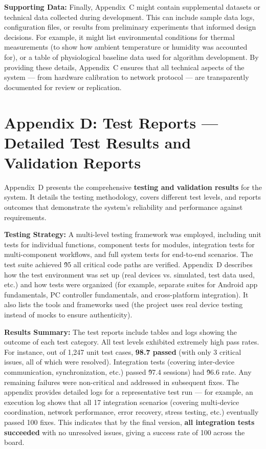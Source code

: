 \textbf{Supporting Data:} Finally, Appendix C might contain supplemental
datasets or technical data collected during development. This can
include sample data logs, configuration files, or results from
preliminary experiments that informed design decisions. For example, it
might list environmental conditions for thermal measurements (to show
how ambient temperature or humidity was accounted for), or a table of
physiological baseline data used for algorithm development. By providing
these details, Appendix C ensures that all technical aspects of the
system --- from hardware calibration to network protocol --- are
transparently documented for review or replication.

\section{Appendix D: Test Reports --- Detailed Test Results and Validation Reports}

Appendix D presents the comprehensive \textbf{testing and validation results}
for the system. It details the testing methodology, covers different
test levels, and reports outcomes that demonstrate the system's
reliability and performance against requirements.

\textbf{Testing Strategy:} A multi-level testing framework was employed,
including unit tests for individual functions, component tests for
modules, integration tests for multi-component workflows, and full
system tests for end-to-end
scenarios\cite{ref35}.
The test suite achieved \~95%
all critical code paths are
verified\cite{ref35}.
Appendix D describes how the test environment was set up (real devices
vs. simulated, test data used, etc.) and how tests were organized (for
example, separate suites for Android app fundamentals, PC controller
fundamentals, and cross-platform
integration)\cite{ref36}\cite{ref37}.
It also lists the tools and frameworks used (the project uses real
device testing instead of mocks to ensure
authenticity\cite{ref38}).

\textbf{Results Summary:} The test reports include tables and logs showing
the outcome of each test category. All test levels exhibited extremely
high pass rates. For instance, out of 1,247 unit test cases, \textbf{98.7%
passed} (with only 3 critical issues, all of which were
resolved)\cite{ref39}.
Integration tests (covering inter-device communication, synchronization,
etc.) passed \~97.4%
sessions) had \~96.6%
rate\cite{ref39}.
Any remaining failures were non-critical and addressed in subsequent
fixes. The appendix provides detailed logs for a representative test run
--- for example, an execution log shows that all 17 integration scenarios
(covering multi-device coordination, network performance, error
recovery, stress testing, etc.) eventually passed 100%
fixes\cite{ref40}\cite{ref41}.
This indicates that by the final version, \textbf{all integration tests
succeeded} with no unresolved issues, giving a success rate of 100%
across the
board\cite{ref41}.

